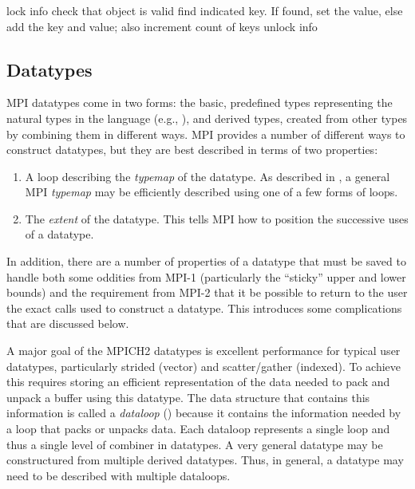 \documentclass{article}
\begin{document}
\subsubsection{}
\begin{algorithm}
lock info
check that object is valid
find indicated key.  
If found, set the value,
else add the key and value; also increment count of keys
unlock info
\end{algorithm}


\subsection{Datatypes}
\label{sec:datatypes}

MPI datatypes come in two forms: the basic, predefined types representing the
natural types in the language (e.g., ), and derived types,
created from other types by combining them in different ways.  MPI provides a
number of different ways to construct datatypes, but they are best described
in terms of two properties:
\begin{enumerate}
\item A loop describing the \emph{typemap} of the datatype.  As described in
  \cite{gropp-swider-lusk99}, a general MPI \emph{typemap} may be efficiently
  described using one of a few forms of loops.
\item The \emph{extent} of the datatype.  This tells MPI how to position the
  successive uses of a datatype.
\end{enumerate}
In addition, there are a number of properties of a datatype that must be saved
to handle both some oddities from MPI-1 (particularly the ``sticky'' upper and
lower bounds) and the requirement from MPI-2 that it be possible to return to
the user the exact calls used to construct a datatype.  This introduces some
complications that are discussed below.

A major goal of the MPICH2 datatypes is excellent performance for typical user
datatypes, particularly strided (vector) and scatter/gather (indexed).  To
achieve this requires storing an efficient representation of the data needed
to pack and unpack a buffer using this datatype.  The data structure that
contains this information is called a \emph{dataloop}
() because it contains the information needed by a
loop that packs or unpacks data.  Each dataloop represents a single loop and
thus a single level of combiner in datatypes.  A very general datatype may be
constructured from multiple derived datatypes.  Thus, in general, a datatype
may need to be described with multiple dataloops.  
\end{document}
